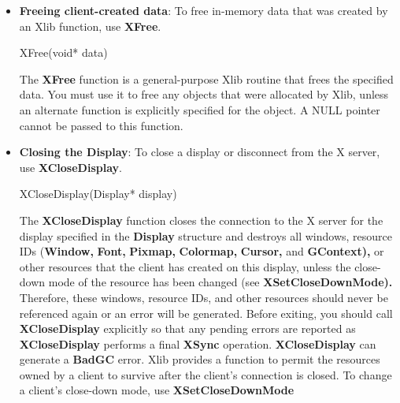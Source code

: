 \documentclass{report}
\begin{document}
\begin{itemize}
            \bigbreak \noindent 
            \begin{cppcode}
                XNoOp(display)
            \end{cppcode}
            \bigbreak \noindent 
            The \textbf{XNoOp} function sends a \textbf{NoOperation} protocol request to the X server, thereby exercising the connection.
        \item \textbf{Freeing client-created data}: To free in-memory data that was created by an Xlib function, use \textbf{XFree}.
            \bigbreak \noindent 
            \begin{cppcode}
            XFree(void* data)
            \end{cppcode}
            \bigbreak \noindent 
            The \textbf{XFree} function is a general-purpose Xlib routine that frees the specified data. You must use it to free any objects that were allocated by Xlib, unless an alternate function is explicitly specified for the object. A NULL pointer cannot be passed to this function.
        \item \textbf{Closing the Display}: To close a display or disconnect from the X server, use \textbf{XCloseDisplay}.
            \bigbreak \noindent 
            \begin{cppcode}
            XCloseDisplay(Display* display)
            \end{cppcode}
            \bigbreak \noindent 
            The \textbf{XCloseDisplay} function closes the connection to the X server for the display specified in the \textbf{Display} structure and destroys all windows, resource IDs (\textbf{Window,} \textbf{Font,} \textbf{Pixmap,} \textbf{Colormap,} \textbf{Cursor,} and \textbf{GContext),} or other resources that the client has created on this display, unless the close-down mode of the resource has been changed (see \textbf{XSetCloseDownMode).} Therefore, these windows, resource IDs, and other resources should never be referenced again or an error will be generated. Before exiting, you should call \textbf{XCloseDisplay} explicitly so that any pending errors are reported as \textbf{XCloseDisplay} performs a final \textbf{XSync} operation.
            \bigbreak \noindent 
            \textbf{XCloseDisplay} can generate a \textbf{BadGC} error.
            \bigbreak \noindent 
            Xlib provides a function to permit the resources owned by a client to survive after the client’s connection is closed. To change a client’s close-down mode, use \textbf{XSetCloseDownMode}
            \bigbreak \noindent 
            \begin{cppcode}

\end{cppcode}
\end{itemize}
\end{document}
